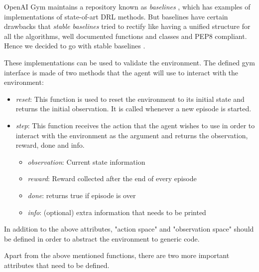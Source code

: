 \documentclass[12pt]{report}
\begin{document}
OpenAI Gym maintains a repository known as \emph{baselines} \cite{baselines}, which has examples of implementations of state-of-art DRL methods. But baselines have certain drawbacks that \emph{stable baselines} tried to rectify like having a unified structure for all the algorithms, well documented functions and classes and PEP8 compliant. Hence we decided to go with stable baselines \cite{stable-baselines}. 

These implementations can be used to validate the environment. The defined gym interface is made of two methods that the agent will use to interact with the environment:

\begin{itemize}
    \item \emph{reset}: This function is used to reset the environment to its initial state and returns the initial observation. It is called whenever a new episode is started. 
    \item \emph{step}: This function receives the action that the agent wishes to use in order to interact with the environment as the argument and returns the observation, reward, done and info. 
    \begin{itemize}
        \item \emph{observation}: Current state information
        \item \emph{reward}: Reward collected after the end of every episode
        \item \emph{done}: returns true if episode is over
        \item\emph{info}: (optional) extra information that needs to be printed
    \end{itemize}
\end{itemize}

In addition to the above attributes, "action space" and "observation space" should be defined in order to abstract the environment to generic code. 

Apart from the above mentioned functions, there are two more important attributes that need to be defined. 
\end{document}
